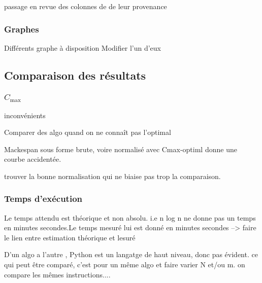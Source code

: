 \documentclass[a4paper,12pt]{report}
\theoremstyle{plain}				%
\theoremstyle{definition}				%
\newcommand\cmax{$C_{\max}$\xspace}
\begin{document}
passage en revue des colonnes de de leur provenance


\subsubsection{Graphes}\label{subsubsec:Graphes}
Différents graphe à disposition
Modifier l'un d'eux

\subsection{Comparaison des résultats} \label{subsubsec:Comparaison des résultats}

\subsubsection{\cmax} \label{subsec:Cmax}
inconvénients 
 
 Comparer des algo quand on ne connaît pas l'optimal
 
 Mackespan sous forme brute, voire normalisé avec Cmax-optiml donne une courbe  accidentée.

 trouver la bonne normalisation qui ne biaise pas trop la comparaison.



\subsubsection{Temps d'exécution} \label{subsubsec:Temps d'exécution}

 Le temps attendu est théorique et non absolu. i.e n log n ne donne pas un temps en minutes secondes.Le temps mesuré lui est donné en minutes secondes --> faire le lien entre estimation théorique et lesuré
 
 D'un algo a l'autre , Python est un langatge de haut niveau, donc pas évident. ce qui peut être comparé, c'est pour un même algo et faire varier N et/ou m. on compare les mêmes instructions....
 
 
 
\end{document}
